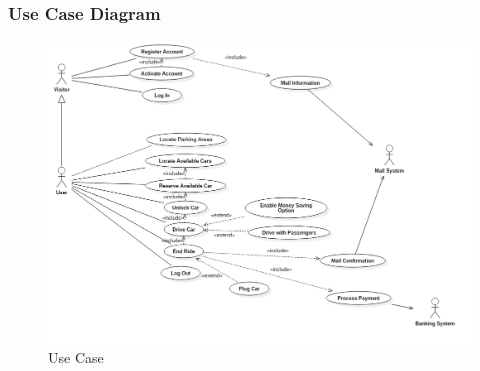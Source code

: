 \subsubsection{Use Case Diagram}
\begin{figure}[h]
\centering
\includegraphics[width=\linewidth,keepaspectratio]{../Diagrams/UC/Use_Case.png}
\caption{Use Case}
\end{figure}
\FloatBarrier
\clearpage

